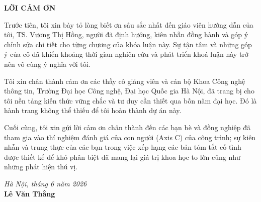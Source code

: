 
\begin{center}
  \textbf{\large{LỜI CẢM ƠN}}
\end{center}

Trước tiên, tôi xin bày tỏ lòng biết ơn sâu sắc nhất đến giáo viên hướng dẫn của tôi,
TS. Vương Thị Hồng, người đã định hướng, kiên nhẫn đồng hành và góp ý chỉnh
sửa chi tiết cho từng chương của khóa luận này. Sự tận tâm và những góp ý của cô đã khiến
khoảng thời gian nghiên cứu và phát triển khoá luận này trở nên vô cùng ý nghĩa với tôi.

Tôi xin chân thành cảm ơn các thầy cô giảng viên và cán bộ Khoa Công nghệ thông tin,
Trường Đại học Công nghệ, Đại học Quốc gia Hà Nội, đã trang bị cho tôi nền tảng kiến
thức vững chắc và tư duy cần thiết qua bốn năm đại học. Đó là hành trang
không thể thiếu để tôi hoàn thành dự án này.

Cuối cùng, tôi xin gửi lời cảm ơn chân thành đến các bạn bè và đồng nghiệp đã tham gia vào
thí nghiệm đánh giá của con người (Axis C) của công trình; sự kiên nhẫn và trung thực 
của các bạn trong việc xếp hạng các bản tóm tắt cố tình được thiết kế để khó phân
biệt đã mang lại giá trị khoa học to lớn cũng như những phát hiện thú vị.

\vspace{0.6em}
\begin{flushright}
  \textit{Hà Nội, tháng 6 năm 2026}\\
  \textbf{Lê Văn Thắng}
\end{flushright}
